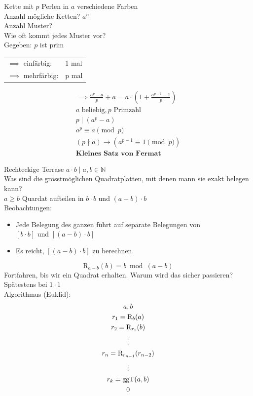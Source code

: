 \begin{bsp}[note = Kombinatorik (''systematisches Zählen'')]
	Kette mit $p$ Perlen in $a$ verschiedene Farben \\
	Anzahl mögliche Ketten? $a^n$ \\
	Anzahl Muster? \\
	Wie oft kommt jedes Muster vor? \\
	Gegeben: $p$ ist prim \\
	\begin{tabular}{ l l }
	$\implies$ einfärbig:		& 1 mal \\
	$\implies$ mehrfärbig:	& p mal
	\end{tabular}
	\begin{gather*}
		\implies \frac{a^p - a}{p} + a = a \cdot ( 1 + \frac{a^{p-1} - 1}{p} ) \\
		a \text{ beliebig}, p \text{ Primzahl} \\
		p \mid ( a^p - a ) \\
		a^p \equiv a \pmod p \\
		( p \nmid a ) \rightarrow ( a^{p-1} \equiv 1 \pmod p ) \\
		\textbf{Kleines Satz von Fermat}
	\end{gather*}
\end{bsp}

\begin{bsp}[note = Geometrie]
	Rechteckige Terrase $a \cdot b \mid a,b \in \mathbb{N}$ \\
	Was sind die grösstmöglichen Quadratplatten, mit denen mann sie exakt belegen kann? \\
	$a \geq b$ \quad Quardat aufteilen in $b \cdot b$ und $(a-b) \cdot b$ \\
	Beobachtungen:
	\begin{itemize}
		\item Jede Belegung des ganzen führt auf separate Belegungen von \\$[b \cdot b]$ und $[(a-b) \cdot b]$
		\item Es reicht, $[(a-b) \cdot b]$ zu berechnen.
	\end{itemize}
	$$\mathrm{R}_{a-b}(b) = b \bmod (a-b)$$
	Fortfahren, bis wir ein Quadrat erhalten. Warum wird das sicher passieren? \\
	\quad Spätestens bei $1 \cdot 1$\\
	Algorithmus (Euklid):
	\begin{gather*}
		a , b \\
		r_1 = \mathrm{R}_b(a) \\
		r_2 = \mathrm{R}_{r_1}(b) \\
		\vdots \\
		r_n = \mathrm{R}_{r_{n-1}}(r_{n-2}) \\
		\vdots \\
		r_k = \operatorname{ggT}(a,b) \\
		0
	\end{gather*}
\end{bsp}

